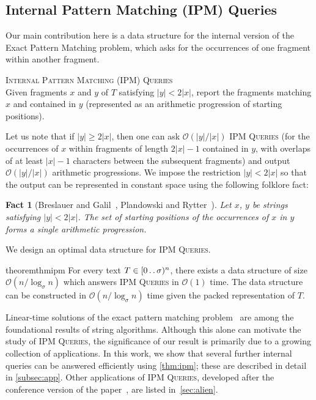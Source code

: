 \documentclass[a4paper]{article}
\newtheorem{fact}[theorem]{Fact}
\theoremstyle{definition}
\theoremstyle{remark}
\newcommand{\IPM}{\textsc{IPM Queries}\xspace}
\newcommand{\dd}{\mathinner{\ldotp\ldotp}}
\newcommand{\Oh}{\mathcal{O}}
\newenvironment{dsproblem}[1]
{\begin{center}\begin{lrbox}{\mybox}\begin{minipage}{0.96\columnwidth}{\textsc{#1}}\\}
{\end{minipage}\end{lrbox}\fbox{\usebox{\mybox}}\end{center}}
\newcommand{\defdsproblem}[2]{
  \begin{dsproblem}{#1}
#2
  \end{dsproblem}
  }
\begin{document}
\subsection{Internal Pattern Matching (IPM) Queries}
Our main contribution here is a data structure
for the internal version of the Exact Pattern Matching problem,
which asks for the occurrences of one fragment within another fragment.

\defdsproblem{\textsc{Internal Pattern Matching (IPM) Queries}}{Given fragments $x$ and $y$ of 
 $T$ satisfying $|y|< 2|x|$, report the fragments matching $x$ and contained in $y$ (represented as an arithmetic progression of starting positions).}
Let us note that if $|y|\ge2|x|$, then one can  ask $\Oh(|y|/|x|)$ \IPM 
(for the occurrences of $x$ within fragments of length $2|x|-1$ contained in $y$, with overlaps of at least $|x|-1$ characters between the subsequent fragments) and output $\Oh(|y|/|x|)$ arithmetic progressions.
We impose the restriction $|y|<2|x|$ so that the output can be represented in constant space using the following folklore fact:

\begin{fact}[Breslauer and Galil~\cite{DBLP:journals/algorithmica/BreslauerG95}, Plandowski and Rytter~\cite{DBLP:conf/icalp/PlandowskiR98}]\label{fct:single}
  Let $x$, $y$ be strings satisfying $|y|< 2|x|$.
  The set of starting positions of the occurrences of $x$ in $y$ forms a single arithmetic progression.
\end{fact}

We design an optimal data structure for \IPM.

\begin{restatable}{theorem}{thmipm}\label{thm:ipm}
  For every text $T\in [0\dd \sigma)^n$, there exists a data structure of size $\Oh(n/\log_\sigma n)$ which answers \IPM in $\Oh(1)$ time.  The data structure can be constructed in $\Oh(n / \log_\sigma n)$ time given the packed representation of $T$.
\end{restatable}

Linear-time solutions of the exact pattern matching problem~\cite{morris1970linear,DBLP:journals/siamcomp/KnuthMP77,DBLP:journals/cacm/BoyerM77} are among the foundational results of string algorithms.
Although this alone can motivate the study of \IPM, the significance of our result is primarily due to a growing collection of applications.
In this work, we show that several further internal queries can be answered efficiently using \cref{thm:ipm}; these are described in detail in \cref{subsec:app}.
Other applications of \IPM, developed after the conference version of the paper~\cite{DBLP:conf/soda/KociumakaRRW15}, are listed in~\cref{sec:alien}.
\end{document}
